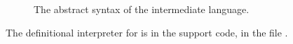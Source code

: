 \documentclass[7x10]{TimesAPriori_MIT}%
\begin{document}
{\begin{figure}[tbp]
\caption{The abstract syntax of the \LangCVar{} intermediate language.}
\label{fig:c0-syntax}
\end{figure}

The definitional interpreter for \LangCVar{} is in the support code,
in the file .

\fi}
\end{document}
